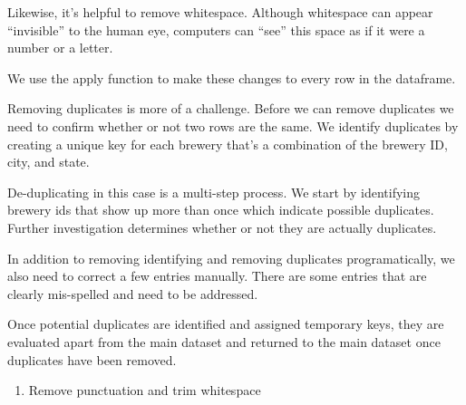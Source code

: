 \documentclass[]{article}
\newenvironment{Shaded}{\begin{snugshade}}{\end{snugshade}}
\newcommand{\KeywordTok}[1]{\textcolor[rgb]{0.13,0.29,0.53}{\textbf{#1}}}
\newcommand{\DataTypeTok}[1]{\textcolor[rgb]{0.13,0.29,0.53}{#1}}
\newcommand{\DecValTok}[1]{\textcolor[rgb]{0.00,0.00,0.81}{#1}}
\newcommand{\StringTok}[1]{\textcolor[rgb]{0.31,0.60,0.02}{#1}}
\newcommand{\CommentTok}[1]{\textcolor[rgb]{0.56,0.35,0.01}{\textit{#1}}}
\newcommand{\OtherTok}[1]{\textcolor[rgb]{0.56,0.35,0.01}{#1}}
\newcommand{\ControlFlowTok}[1]{\textcolor[rgb]{0.13,0.29,0.53}{\textbf{#1}}}
\newcommand{\OperatorTok}[1]{\textcolor[rgb]{0.81,0.36,0.00}{\textbf{#1}}}
\newcommand{\NormalTok}[1]{#1}
\providecommand{\tightlist}{%
  \setlength{\itemsep}{0pt}\setlength{\parskip}{0pt}}
\begin{document}
Likewise, it's helpful to remove whitespace. Although whitespace can
appear ``invisible'' to the human eye, computers can ``see'' this space
as if it were a number or a letter.

We use the apply function to make these changes to every row in the
dataframe.

Removing duplicates is more of a challenge. Before we can remove
duplicates we need to confirm whether or not two rows are the same. We
identify duplicates by creating a unique key for each brewery that's a
combination of the brewery ID, city, and state.

De-duplicating in this case is a multi-step process. We start by
identifying brewery ids that show up more than once which indicate
possible duplicates.\\
Further investigation determines whether or not they are actually
duplicates.

In addition to removing identifying and removing duplicates
programatically, we also need to correct a few entries manually. There
are some entries that are clearly mis-spelled and need to be addressed.

Once potential duplicates are identified and assigned temporary keys,
they are evaluated apart from the main dataset and returned to the main
dataset once duplicates have been removed.

\begin{enumerate}
\def\labelenumi{\arabic{enumi})}
\tightlist
\item
  Remove punctuation and trim whitespace
\end{enumerate}

\begin{Shaded}
\end{Shaded}
\end{document}
